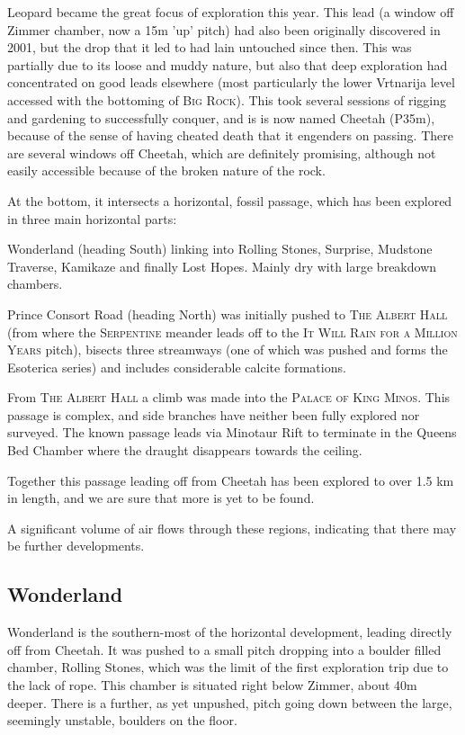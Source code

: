Leopard became the great focus of exploration this year. This lead
(a window off Zimmer chamber, now a 15m 'up' pitch) had also been
originally discovered in 2001, but the drop that it led to had lain
untouched since then. 
This was partially due to its loose and muddy nature, but also that deep
exploration had concentrated on good leads elsewhere (most particularly the
lower Vrtnarija level accessed with the bottoming of \textsc{Big Rock}). This
took several sessions of rigging and gardening to successfully conquer, and is
is now named Cheetah (P35m), because of the sense of having cheated death that
it engenders on passing. There are several windows off Cheetah, which are
definitely promising, although not easily accessible because of the broken nature
of the rock.

At the bottom, it intersects a horizontal, fossil passage, which has
been explored in three main horizontal parts:

Wonderland (heading South) linking into Rolling Stones, Surprise,
Mudstone Traverse, Kamikaze and finally Lost Hopes. Mainly dry with large breakdown chambers. 

Prince Consort Road (heading North) was initially pushed to \textsc{The Albert
Hall} (from where the \textsc{Serpentine} meander leads off to the \textsc{It
Will Rain for a Million Years} pitch), bisects three streamways (one of which
was pushed and forms the Esoterica series) and includes considerable calcite
formations.

From \textsc{The Albert Hall} a climb was made into the
\textsc{Palace of King Minos}. This passage is complex, and side branches have neither been fully
explored nor surveyed. The known passage leads via Minotaur Rift to terminate in the
Queens Bed Chamber where the draught disappears towards the ceiling.

Together this passage leading off from Cheetah has been explored to over 1.5 km in length,
and we are sure that more is yet to be found. 

A significant volume of air flows through these regions, indicating that there may
be further developments.

\subsection{Wonderland}

Wonderland is the southern-most of the horizontal development, leading
directly off from Cheetah. It was pushed to a small pitch dropping
into a boulder filled chamber, Rolling Stones, which was the limit of the first
exploration trip due to the lack of rope.  This chamber is situated right below
Zimmer, about 40m deeper. There is a further, as yet unpushed, pitch going down
between the large, seemingly unstable, boulders on the floor.

